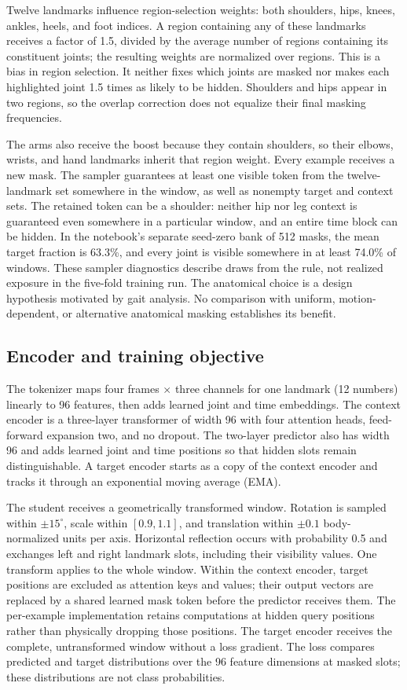 \documentclass[10pt,twocolumn,letterpaper]{article}
\begin{document}
Twelve landmarks influence region-selection weights: both shoulders, hips, knees, ankles, heels, and foot indices. A region containing any of these landmarks receives a factor of 1.5, divided by the average number of regions containing its constituent joints; the resulting weights are normalized over regions. This is a bias in region selection. It neither fixes which joints are masked nor makes each highlighted joint 1.5 times as likely to be hidden. Shoulders and hips appear in two regions, so the overlap correction does not equalize their final masking frequencies.

The arms also receive the boost because they contain shoulders, so their elbows, wrists, and hand landmarks inherit that region weight. Every example receives a new mask. The sampler guarantees at least one visible token from the twelve-landmark set somewhere in the window, as well as nonempty target and context sets. The retained token can be a shoulder: neither hip nor leg context is guaranteed even somewhere in a particular window, and an entire time block can be hidden. In the notebook's separate seed-zero bank of 512 masks, the mean target fraction is 63.3\%, and every joint is visible somewhere in at least 74.0\% of windows. These sampler diagnostics describe draws from the rule, not realized exposure in the five-fold training run. The anatomical choice is a design hypothesis motivated by gait analysis. No comparison with uniform, motion-dependent, or alternative anatomical masking establishes its benefit.

\subsection{Encoder and training objective}
The tokenizer maps four frames $\times$ three channels for one landmark (12 numbers) linearly to 96 features, then adds learned joint and time embeddings. The context encoder is a three-layer transformer of width 96 with four attention heads, feed-forward expansion two, and no dropout. The two-layer predictor also has width 96 and adds learned joint and time positions so that hidden slots remain distinguishable. A target encoder starts as a copy of the context encoder and tracks it through an exponential moving average (EMA).

The student receives a geometrically transformed window. Rotation is sampled within $\pm15^\circ$, scale within $[0.9,1.1]$, and translation within $\pm0.1$ body-normalized units per axis. Horizontal reflection occurs with probability 0.5 and exchanges left and right landmark slots, including their visibility values. One transform applies to the whole window. Within the context encoder, target positions are excluded as attention keys and values; their output vectors are replaced by a shared learned mask token before the predictor receives them. The per-example implementation retains computations at hidden query positions rather than physically dropping those positions. The target encoder receives the complete, untransformed window without a loss gradient. The loss compares predicted and target distributions over the 96 feature dimensions at masked slots; these distributions are not class probabilities.
\end{document}
